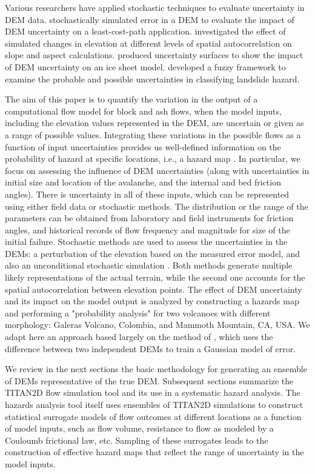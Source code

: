 \documentclass[12pt]{article}
\begin{document}
Various researchers have applied stochastic techniques to evaluate
uncertainty in DEM data. \citet{Ehlschlaeger_1996} stochastically
simulated error in a DEM to evaluate the impact of DEM uncertainty on
a least-cost-path application. \citet{Hunter_Goodchild_1997}
investigated the effect of simulated changes in elevation at different
levels of spatial autocorrelation on slope and aspect
calculations. \citet{Felix_Hebeler} produced uncertainty surfaces to
show the impact of DEM uncertainty on an ice sheet
model. \citet{Amii_Darnell} developed a fuzzy framework to examine the
probable and possible uncertainties in classifying landslide hazard.

The aim of this paper is to quantify the variation in the output of a
computational flow model for block and ash flows, when the model
inputs, including the elevation values represented in the DEM, are
uncertain or given as a range of possible values. Integrating these
variations in the possible flows as a function of input uncertainties
provides us well-defined information on the probability of hazard at
specific locations, i.e., a hazard map \citep{Keith}.  In particular,
we focus on assessing the influence of DEM uncertainties (along with
uncertainties in initial size and location of the avalanche, and the
internal and bed friction angles).  There is uncertainty in all of
these inputs, which can be represented using either field data or
stochastic methods.  The distribution or the range of the parameters
can be obtained from laboratory and field instruments for friction
angles, and historical records of flow frequency and magnitude for
size of the initial failure.  Stochastic methods are used to assess
the uncertainties in the DEMs: a perturbation of the elevation based
on the measured error model, and also an unconditional stochastic
simulation \citep{Ehlschlaeger_1996}.  Both methods generate multiple
likely representations of the actual terrain, while the second one
accounts for the spatial autocorrelation between elevation points.
The effect of DEM uncertainty and its impact on the model output is
analyzed by constructing a hazards map and performing a "probability
analysis" for two volcanoes with different morphology: Galeras
Volcano, Colombia, and Mammoth Mountain, CA, USA.  We adapt here an
approach based largely on the method of \citet{Ehlschlaeger_1996},
which uses the difference between two independent DEMs to train a
Gaussian model of error.

We review in the next sections the basic methodology for generating an
ensemble of DEMs representative of the true DEM.  Subsequent sections
summarize the TITAN2D flow simulation tool and its use in a systematic
hazard analysis. The hazards analysis tool itself uses ensembles of
TITAN2D simulations to construct statistical surrogate models of flow
outcomes at different locations as a function of model inputs, such as
flow volume, resistance to flow as modeled by a Couloumb frictional
law, etc.  Sampling of these surrogates leads to the construction of
effective hazard maps that reflect the range of uncertainty in the
model inputs.
\end{document}
